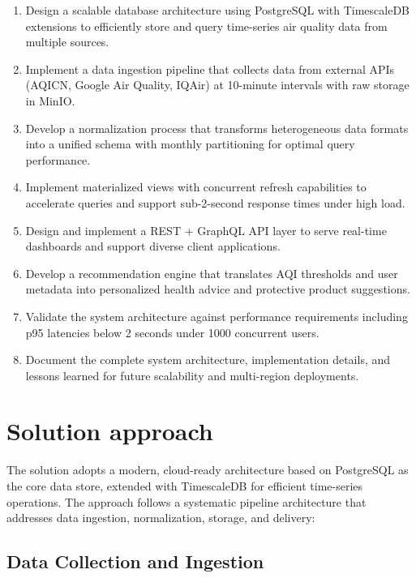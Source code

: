 \begin{enumerate}
    \item Design a scalable database architecture using PostgreSQL with TimescaleDB extensions to efficiently store and query time-series air quality data from multiple sources.
    \item Implement a data ingestion pipeline that collects data from external APIs (AQICN, Google Air Quality, IQAir) at 10-minute intervals with raw storage in MinIO.
    \item Develop a normalization process that transforms heterogeneous data formats into a unified schema with monthly partitioning for optimal query performance.
    \item Implement materialized views with concurrent refresh capabilities to accelerate queries and support sub-2-second response times under high load.
    \item Design and implement a REST + GraphQL API layer to serve real-time dashboards and support diverse client applications.
    \item Develop a recommendation engine that translates AQI thresholds and user metadata into personalized health advice and protective product suggestions.
    \item Validate the system architecture against performance requirements including p95 latencies below 2 seconds under 1000 concurrent users.
    \item Document the complete system architecture, implementation details, and lessons learned for future scalability and multi-region deployments.
\end{enumerate}



\section{Solution approach}
\label{sec:intro_sol}

The solution adopts a modern, cloud-ready architecture based on PostgreSQL as the core data store, extended with TimescaleDB for efficient time-series operations. The approach follows a systematic pipeline architecture that addresses data ingestion, normalization, storage, and delivery:

\subsection{Data Collection and Ingestion}
\label{sec:intro_ingestion}

